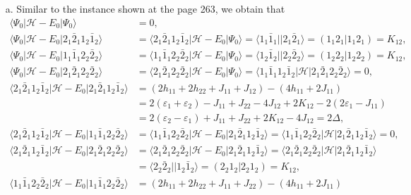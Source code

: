 \documentclass[a4paper]{book}
\newcounter{solution}[chapter]
\begin{document}
\begin{solution}
\begin{itemize}
	\item[a.] Similar to the instance shown at the page 263, we obtain that
	\begin{align*}
		\langle \Psi_0 | \mathscr{H} - E_0 | \Psi_0 \rangle &= 0 , \\
		 \langle \Psi_0 | \mathscr{H} - E_0 | 2_1 \bar{2}_1 1_2 \bar{1}_2 \rangle &= \langle 2_1 \bar{2}_1 1_2 \bar{1}_2 | \mathscr{H} - E_0 | \Psi_0 \rangle = \langle 1_1 \bar{1}_1 || 2_1 \bar{2}_1 \rangle = ( 1_1 2_1 | 1_1 2_1 ) = K_{12} , \\
		 \langle \Psi_0 | \mathscr{H} - E_0 | 1_1 \bar{1}_1 2_2 \bar{2}_2 \rangle &= \langle 1_1 \bar{1}_1 2_2 \bar{2}_2 | \mathscr{H} - E_0 | \Psi_0 \rangle = \langle 1_2 \bar{1}_2 ||  2_2 \bar{2}_2 \rangle = ( 1_2 2_2 | 1_2 2_2 ) = K_{12} , \\
		 \langle \Psi_0 | \mathscr{H} - E_0 | 2_1 \bar{2}_1 2_2 \bar{2}_2 \rangle &= \langle 2_1 \bar{2}_1 2_2 \bar{2}_2 | \mathscr{H} - E_0 | \Psi_0 \rangle = \langle 1_1 \bar{1}_1 1_2 \bar{1}_2 | \mathscr{H} | 2_1 \bar{2}_1 2_2 \bar{2}_2 \rangle = 0, \\
		 \langle 2_1 \bar{2}_1 1_2 \bar{1}_2 | \mathscr{H} - E_0 | 2_1 \bar{2}_1 1_2 \bar{1}_2 \rangle &= ( 2h_{11} + 2h_{22} + J_{11} + J_{12} ) - ( 4 h_{11} + 2J_{11} ) \\
		 &= 2( \varepsilon_1 + \varepsilon_2 ) - J_{11} + J_{22} - 4J_{12} + 2K_{12} - 2( 2\varepsilon_1 - J_{11} ) \\
		 &= 2( \varepsilon_2 - \varepsilon_1 ) + J_{11} + J_{22} + 2K_{12} - 4J_{12} = 2 \Delta , \\
		 \langle 2_1 \bar{2}_1 1_2 \bar{1}_2 | \mathscr{H} - E_0 | 1_1 \bar{1}_1 2_2 \bar{2}_2 \rangle &= \langle 1_1 \bar{1}_1 2_2 \bar{2}_2 | \mathscr{H} - E_0 | 2_1 \bar{2}_1 1_2 \bar{1}_2 \rangle = \langle 1_1 \bar{1}_1 2_2 \bar{2}_2 | \mathscr{H} | 2_1 \bar{2}_1 1_2 \bar{1}_2 \rangle = 0 , \\
		 \langle 2_1 \bar{2}_1 1_2 \bar{1}_2 | \mathscr{H} - E_0 | 2_1 \bar{2}_1 2_2 \bar{2}_2 \rangle &= \langle 2_1 \bar{2}_1 2_2 \bar{2}_2 | \mathscr{H} - E_0 | 2_1 \bar{2}_1 1_2 \bar{1}_2 \rangle = \langle 2_1 \bar{2}_1 2_2 \bar{2}_2 | \mathscr{H} | 2_1 \bar{2}_1 1_2 \bar{1}_2 \rangle \\
		 &= \langle 2_2 \bar{2}_2 || 1_2 \bar{1}_2 \rangle = ( 2_2 1_2 | 2_2 1_2 ) = K_{12}, \\
		 \langle 1_1 \bar{1}_1 2_2 \bar{2}_2 | \mathscr{H} - E_0 | 1_1 \bar{1}_1 2_2 \bar{2}_2 \rangle &= ( 2h_{11} + 2h_{22} + J_{11} + J_{22} ) - ( 4 h_{11} + 2J_{11} ) \\

\end{align*}
\end{itemize}
\end{solution}
\end{document}
